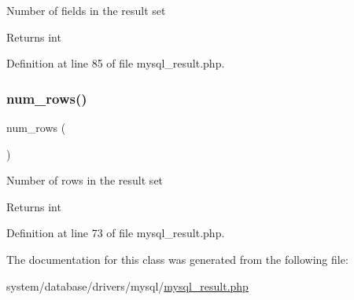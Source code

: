 Number of fields in the result set

\begin{DoxyReturn}{Returns}
int 
\end{DoxyReturn}


Definition at line 85 of file mysql\+\_\+result.\+php.

\mbox{\label{class_c_i___d_b__mysql__result_a218657c303ee499b97710ab0cd2f5d6e}} 
\subsubsection{\texorpdfstring{num\_rows()}{num\_rows()}}
{\footnotesize\ttfamily num\+\_\+rows (\begin{DoxyParamCaption}{ }\end{DoxyParamCaption})}

Number of rows in the result set

\begin{DoxyReturn}{Returns}
int 
\end{DoxyReturn}


Definition at line 73 of file mysql\+\_\+result.\+php.



The documentation for this class was generated from the following file\+:\begin{DoxyCompactItemize}
\item 
system/database/drivers/mysql/\mbox{\hyperlink{mysql__result_8php}{mysql\+\_\+result.\+php}}\end{DoxyCompactItemize}
